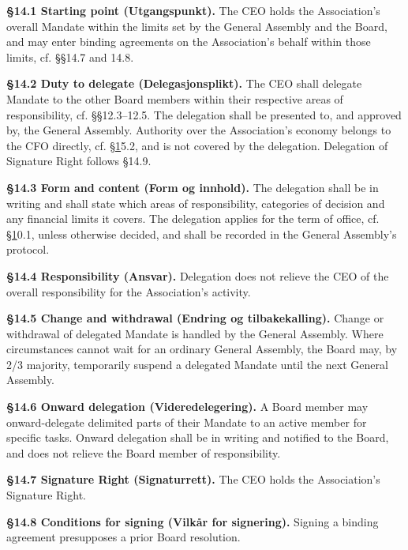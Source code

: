 \documentclass{../../../Common/Latex/Templates/rapport}
\begin{document}
\label{bylaw:14}
\textbf{\S 14.1 Starting point (Utgangspunkt).}\label{bylaw:14.1} The CEO holds the Association's overall Mandate within the limits set by the General Assembly and the Board, and may enter binding agreements on the Association's behalf within those limits, cf. \S\S14.7 and 14.8.

\textbf{\S 14.2 Duty to delegate (Delegasjonsplikt).}\label{bylaw:14.2} The CEO shall delegate Mandate to the other Board members within their respective areas of responsibility, cf. \S\S12.3--12.5. The delegation shall be presented to, and approved by, the General Assembly. Authority over the Association's economy belongs to the CFO directly, cf. \hyperref[bylaw:1]{\S 1}5.2, and is not covered by the delegation. Delegation of Signature Right follows \S14.9.

\textbf{\S 14.3 Form and content (Form og innhold).}\label{bylaw:14.3} The delegation shall be in writing and shall state which areas of responsibility, categories of decision and any financial limits it covers. The delegation applies for the term of office, cf. \hyperref[bylaw:1]{\S 1}0.1, unless otherwise decided, and shall be recorded in the General Assembly's protocol.

\textbf{\S 14.4 Responsibility (Ansvar).}\label{bylaw:14.4} Delegation does not relieve the CEO of the overall responsibility for the Association's activity.

\textbf{\S 14.5 Change and withdrawal (Endring og tilbakekalling).}\label{bylaw:14.5} Change or withdrawal of delegated Mandate is handled by the General Assembly. Where circumstances cannot wait for an ordinary General Assembly, the Board may, by 2/3 majority, temporarily suspend a delegated Mandate until the next General Assembly.

\textbf{\S 14.6 Onward delegation (Videredelegering).}\label{bylaw:14.6} A Board member may onward-delegate delimited parts of their Mandate to an active member  for specific tasks. Onward delegation shall be in writing and notified to the Board, and does not relieve the Board member of responsibility.

\textbf{\S 14.7 Signature Right (Signaturrett).}\label{bylaw:14.7} The CEO holds the Association's Signature Right.

\textbf{\S 14.8 Conditions for signing (Vilkår for signering).}\label{bylaw:14.8} Signing a binding agreement presupposes a prior Board resolution.
\end{document}
